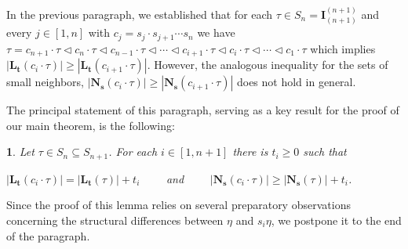 \documentclass[a4 paper,12pt]{article}
\newcommand{\sma}{\triangleleft}
\newtheorem{subnum}{}[numeris]
\begin{document}
In the previous paragraph, we established that for each $\tau \in S_{n}=\textbf{I}_{(n+1)}^{(n+1)}$ and every $j\in \left[1,n\right]$ with $c_{j}=s_{j}\cdot s_{j+1}\cdots s_{n}$ we have  
$\tau = c_{n+1}\cdot \tau \sma c_{n}\cdot \tau  \sma c_{n-1}\cdot \tau \sma \cdots \sma c_{i+1}\cdot \tau \sma c_{i}\cdot \tau \sma \cdots \sma c_{1}\cdot \tau$
which implies $\left|\textbf{L}_{\textbf{t}}(c_{i}\cdot \tau)\right| \geq  \left|\textbf{L}_{\textbf{t}}(c_{i+1}\cdot \tau)\right|$.  However,   the analogous inequality for the sets of small neighbors, $\left|\mathbf{N}_{\textbf{s}}(c_{i}\cdot \tau )\right|\geq \left|\mathbf{N}_{\textbf{s}}(c_{i+1}\cdot \tau)\right|$ does not hold in general.



The principal statement of this paragraph, serving as a key  result for the proof of our main theorem, is the following:




\begin{subnum}  \textit{Let $\tau\in S_{n} \subseteq S_{n+1}$. For each $i\in \left[1,n+1\right]$  there is  $t_i\geq 0$  such that }
 \begin{center}
 \textit{$\left|\textbf{L}_{\textbf{t}}(c_{i}\cdot  \tau)\right| =\left|\textbf{L}_{\textbf{t}}( \tau)\right| +t_i$ \  \  \  \  and  \  \  \  \  
		 $\left|\textbf{N}_{\textbf{s}}(c_{i}\cdot  \tau)\right| \geq \left|\textbf{N}_{\textbf{s}}( \tau)\right| +t_i$.}
\end{center}
\label{kern_aussage}
\end{subnum}
Since the proof of this lemma relies on several preparatory observations 
concerning the structural differences between $\eta$ and $s_i \eta$, 
we postpone it to the end of the paragraph.
\end{document}
